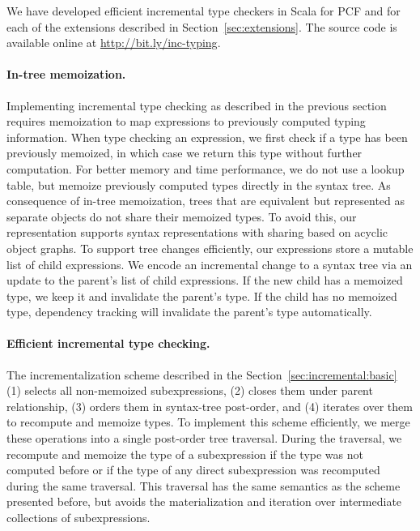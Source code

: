 \documentclass{llncs}
\begin{document}
We have developed efficient incremental type checkers in Scala for PCF and for
each of the extensions described in Section~\ref{sec:extensions}. The source
code is available online at \url{http://bit.ly/inc-typing}.

\paragraph{In-tree memoization.} Implementing incremental type checking as
described in the previous section requires memoization to map expressions to
previously computed typing information. When type checking an expression, we first check if a type
has been previously memoized, in which case we return this type without further
computation.
For better memory and time performance,  
we do not use a lookup table, but memoize previously computed types directly in the
syntax tree. 
As consequence of in-tree memoization, trees that are equivalent
but represented as separate objects do not share their memoized types. To avoid this, our representation supports syntax representations with sharing
based on acyclic object graphs.
%
To support tree changes efficiently, our expressions store a mutable list of
child expressions. We encode an incremental change to a syntax tree via an
update to the parent's list of child expressions. If the new child has a
memoized type, we keep it and invalidate the parent's type. If the child has no
memoized type, dependency tracking will invalidate the parent's type
automatically.

\paragraph{Efficient incremental type checking.} The incrementalization scheme
described in the Section~\ref{sec:incremental:basic} (1) selects all non-memoized subexpressions,
(2) closes them under parent relationship, (3) orders them in syntax-tree
post-order, and (4) iterates over them to recompute and memoize types. To
implement this scheme efficiently, we merge these operations into a single
post-order tree traversal. During the traversal, we recompute and memoize the
type of a subexpression if the type was not computed before or if the type of
any direct subexpression was recomputed during the same traversal. This
traversal has the same semantics as the scheme presented before, but avoids the
materialization and iteration over intermediate collections of subexpressions.
\end{document}

